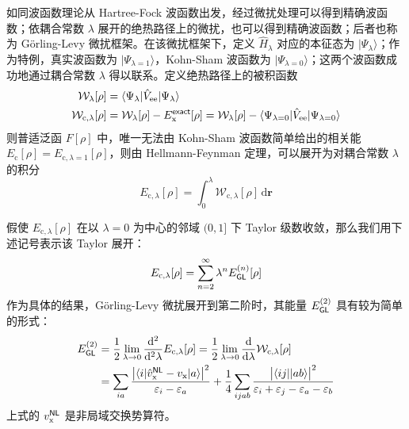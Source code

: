 如同波函数理论从 Hartree-Fock 波函数出发，经过微扰处理可以得到精确波函数；依耦合常数 $\lambda$ 展开的绝热路径上的微扰，也可以得到精确波函数；后者也称为 G\"orling-Levy 微扰框架\cite{Goerling-Levy.PRB.1993, Goerling-Levy.PRA.1994}。在该微扰框架下，定义 $\hat H_\lambda$ 对应的本征态为 $| \Psi_\lambda \rangle$；作为特例，真实波函数为 $| \Psi_{\lambda = 1} \rangle$，Kohn-Sham 波函数为 $| \Psi_{\lambda = 0} \rangle$；这两个波函数成功地通过耦合常数 $\lambda$ 得以联系。定义绝热路径上的被积函数
\begin{align}
  \mathcal{W}_{\lambda} [\rho] &= \langle \Psi_\lambda | \hat V_\mathrm{ee} | \Psi_\lambda \rangle \\
  \mathcal{W}_{\mathrm{c}, \lambda} [\rho] &= \mathcal{W}_{\lambda} [\rho] - E_\mathrm{x}^{\textsf{exact}} [\rho] = \mathcal{W}_{\lambda} [\rho] - \langle \Psi_{\lambda = 0} | \hat V_\mathrm{ee} | \Psi_{\lambda = 0} \rangle
\end{align}
则普适泛函 $F[\rho]$ 中，唯一无法由 Kohn-Sham 波函数简单给出的相关能 $E_\mathrm{c} [\rho] = E_{\mathrm{c}, \lambda=1} [\rho]$，则由 Hellmann-Feynman 定理，可以展开为对耦合常数 $\lambda$ 的积分
\begin{equation}
  E_{\mathrm{c}, \lambda} [\rho] = \int_0^\lambda \mathcal{W}_{\mathrm{c}, \lambda} [\rho] \, \mathrm{d} \bm{r}
\end{equation}

假使 $E_{\mathrm{c}, \lambda} [\rho]$ 在以 $\lambda=0$ 为中心的邻域 $(0, 1]$ 下 Taylor 级数收敛，那么我们用下述记号表示该 Taylor 展开：
\begin{equation}
  \label{eq.2.e-c-lambda}
  E_{\mathrm{c}, \lambda} [\rho] = \sum_{n=2}^{\infty} \lambda^n E_{\textsf{GL}}^{(n)} [\rho]
\end{equation}
作为具体的结果，G\"orling-Levy 微扰展开到第二阶时，其能量 $E_{\textsf{GL}}^{(2)}$ 具有较为简单的形式：
\begin{align}
  \label{eq.2.GL2-W}
  E_{\textsf{GL}}^{(2)} &= \frac{1}{2} \lim_{\lambda \rightarrow 0} \frac{\mathrm{d}^2}{\mathrm{d}^2 \lambda} E_{\mathrm{c}, \lambda} [\rho] = \frac{1}{2} \lim_{\lambda \rightarrow 0} \frac{\mathrm{d}}{\mathrm{d} \lambda} \mathcal{W}_{\mathrm{c}, \lambda} [\rho] \\
  \label{eq.2.GL2-def}
  &= \sum_{ia} \frac{\big| \langle i | \hat v_\mathrm{x}^{\textsf{NL}} - v_\mathrm{x} | a \rangle \big|^2}{\varepsilon_i - \varepsilon_a} + \frac{1}{4} \sum_{ijab} \frac{\big| \langle ij || ab \rangle \big|^2}{\varepsilon_i + \varepsilon_j - \varepsilon_a - \varepsilon_b}
\end{align}
上式的 $v_\mathrm{x}^{\textsf{NL}}$ 是非局域交换势算符。

